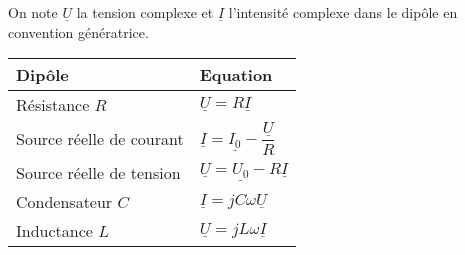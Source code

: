 \documentclass[a4paper]{article}
\begin{document}
\pagestyle{fancy}
\fancyhf{}
\setlength{\headheight}{15pt}

\begin{center}
	\large{}
\end{center}


On note \(\underline{U}\) la tension complexe et \(\underline{I}\) l'intensité complexe dans le dipôle en convention génératrice.\\
\begin{table}[h]
\centering
\begin{tabular}{l|l}
Dipôle                   & Equation \\ \hline
Résistance \(R\)             & \(\underline{U}=R\underline{I}\)     \\
Source réelle de courant & \(\underline{I}=\underline{I_0}-\dfrac{\underline{U}}{R}\)   \\
Source réelle de tension & \(\underline{U}=\underline{U_0}-R\underline{I}\)   \\
Condensateur \(C\)           & \(\underline{I}=jC\omega\underline{U}\)      \\
Inductance \(L\)             & \(\underline{U}=jL\omega\underline{I}\)   
\end{tabular}
\end{table}
\end{document}
